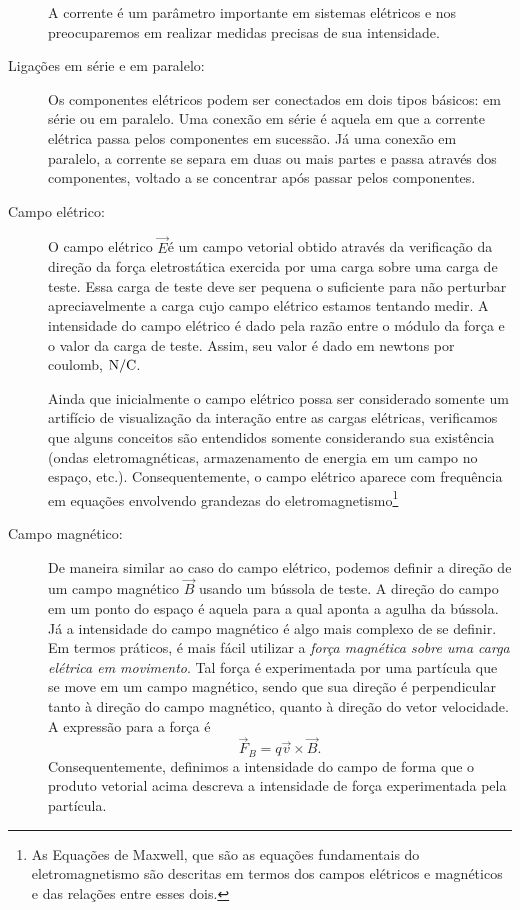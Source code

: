 \begin{description}
    A corrente é um parâmetro importante em sistemas elétricos e nos preocuparemos em realizar medidas precisas de sua intensidade.
    
    \item[Ligações em série e em paralelo:] Os componentes elétricos podem ser conectados em dois tipos básicos: em série ou em paralelo. Uma conexão em série é aquela em que a corrente elétrica passa pelos componentes em sucessão. Já uma conexão em paralelo, a corrente se separa em duas ou mais partes e passa através dos componentes, voltado a se concentrar após passar pelos componentes.
    
    \item[Campo elétrico:] O campo elétrico $\vec{E}$é um campo vetorial obtido através da verificação da direção da força eletrostática exercida por uma carga sobre uma carga de teste. Essa carga de teste deve ser pequena o suficiente para não perturbar apreciavelmente a carga cujo campo elétrico estamos tentando medir. A intensidade do campo elétrico é dado pela razão entre o módulo da força e o valor da carga de teste. Assim, seu valor é dado em newtons por coulomb, $\rm{N}/\rm{C}$.
    
    Ainda que inicialmente o campo elétrico possa ser considerado somente um artifício de visualização da interação entre as cargas elétricas, verificamos que alguns conceitos são entendidos somente considerando sua existência (ondas eletromagnéticas, armazenamento de energia em um campo no espaço, etc.). Consequentemente, o campo elétrico aparece com frequência em equações envolvendo grandezas do eletromagnetismo\footnote{As Equações de Maxwell, que são as equações fundamentais do eletromagnetismo são descritas em termos dos campos elétricos e magnéticos e das relações entre esses dois.}
    
    \item[Campo magnético:] De maneira similar ao caso do campo elétrico, podemos definir a direção de um campo magnético $\vec{B}$ usando um bússola de teste. A direção do campo em um ponto do espaço é aquela para a qual aponta a agulha da bússola. Já a intensidade do campo magnético é algo mais complexo de se definir. Em termos práticos, é mais fácil utilizar a \emph{força magnética sobre uma carga elétrica em movimento}. Tal força é experimentada por uma partícula que se move em um campo magnético, sendo que sua direção é perpendicular tanto à direção do campo magnético, quanto à direção do vetor velocidade. A expressão para a força é
    \begin{equation}\label{Eq:DefFMagChar}
        \vec{F}_B = q \vec{v}\times\vec{B}.
    \end{equation}
    Consequentemente, definimos a intensidade do campo de forma que o produto vetorial acima descreva a intensidade de força experimentada pela partícula.
    

\end{description}
